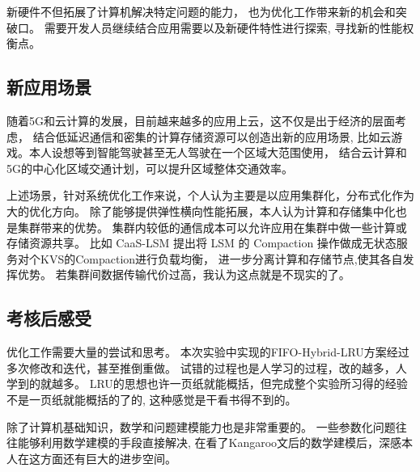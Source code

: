 新硬件不但拓展了计算机解决特定问题的能力，
也为优化工作带来新的机会和突破口。
需要开发人员继续结合应用需要以及新硬件特性进行探索, 寻找新的性能权衡点。

\subsection{新应用场景}

随着5G和云计算的发展，目前越来越多的应用上云，这不仅是出于经济的层面考虑，
结合低延迟通信和密集的计算存储资源可以创造出新的应用场景,
比如云游戏。本人设想等到智能驾驶甚至无人驾驶在一个区域大范围使用，
结合云计算和5G的中心化区域交通计划，可以提升区域整体交通效率。

上述场景，针对系统优化工作来说，个人认为主要是以应用集群化，分布式化作为大的优化方向。
除了能够提供弹性横向性能拓展，本人认为计算和存储集中化也是集群带来的优势。
集群内较低的通信成本可以允许应用在集群中做一些计算或存储资源共享。
比如 CaaS-LSM 提出将 LSM 的 Compaction 操作做成无状态服务对个KVS的Compaction进行负载均衡，
进一步分离计算和存储节点,使其各自发挥优势\cite{qiaolin_yu_caas-lsm_2024}。
若集群间数据传输代价过高，我认为这点就是不现实的了。

\subsection{考核后感受}

优化工作需要大量的尝试和思考。
本次实验中实现的FIFO-Hybrid-LRU方案经过多次修改和迭代，甚至推倒重做。
试错的过程也是人学习的过程，改的越多，人学到的就越多。
LRU的思想也许一页纸就能概括，但完成整个实验所习得的经验不是一页纸就能概括的了的,
这种感觉是干看书得不到的。

除了计算机基础知识，数学和问题建模能力也是非常重要的。
一些参数化问题往往能够利用数学建模的手段直接解决,
在看了Kangaroo文后的数学建模后，深感本人在这方面还有巨大的进步空间。
